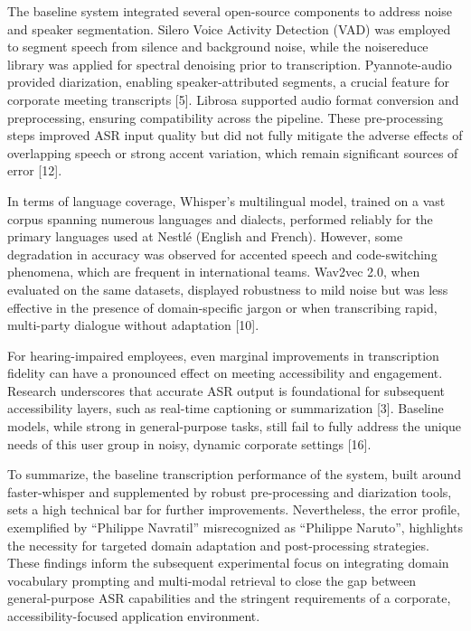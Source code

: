 \documentclass[12pt,a4paper]{article}
\begin{document}
The baseline system integrated several open-source components to address noise and speaker segmentation. Silero Voice Activity Detection (VAD) was employed to segment speech from silence and background noise, while the noisereduce library was applied for spectral denoising prior to transcription. Pyannote-audio provided diarization, enabling speaker-attributed segments, a crucial feature for corporate meeting transcripts [5]. Librosa supported audio format conversion and preprocessing, ensuring compatibility across the pipeline. These pre-processing steps improved ASR input quality but did not fully mitigate the adverse effects of overlapping speech or strong accent variation, which remain significant sources of error [12].


In terms of language coverage, Whisper’s multilingual model, trained on a vast corpus spanning numerous languages and dialects, performed reliably for the primary languages used at Nestlé (English and French). However, some degradation in accuracy was observed for accented speech and code-switching phenomena, which are frequent in international teams. Wav2vec 2.0, when evaluated on the same datasets, displayed robustness to mild noise but was less effective in the presence of domain-specific jargon or when transcribing rapid, multi-party dialogue without adaptation [10].


For hearing-impaired employees, even marginal improvements in transcription fidelity can have a pronounced effect on meeting accessibility and engagement. Research underscores that accurate ASR output is foundational for subsequent accessibility layers, such as real-time captioning or summarization [3]. Baseline models, while strong in general-purpose tasks, still fail to fully address the unique needs of this user group in noisy, dynamic corporate settings [16].


To summarize, the baseline transcription performance of the system, built around faster-whisper and supplemented by robust pre-processing and diarization tools, sets a high technical bar for further improvements. Nevertheless, the error profile, exemplified by “Philippe Navratil” misrecognized as “Philippe Naruto”, highlights the necessity for targeted domain adaptation and post-processing strategies. These findings inform the subsequent experimental focus on integrating domain vocabulary prompting and multi-modal retrieval to close the gap between general-purpose ASR capabilities and the stringent requirements of a corporate, accessibility-focused application environment.
\end{document}
